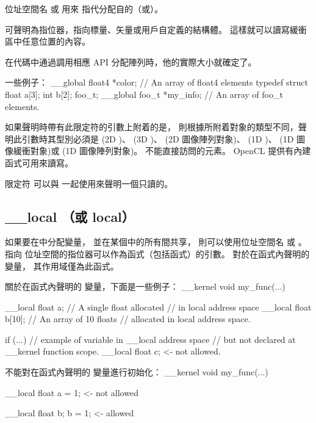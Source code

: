 位址空間名  或  用來
指代分配自的（或）。

 可聲明為指位器，指向標量、矢量或用戶自定義的結構體。
這樣就可以讀寫緩衝區中任意位置的內容。

在代碼中通過調用相應 API 分配陣列時，他的實際大小就確定了。

一些例子：
\startclc
__global float4	*color;		// An array of float4 elements
typedef struct {
	float	a[3];
	int	b[2];
} foo_t;
__global foo_t	*my_info;	// An array of foo_t elements.
\stopclc

如果聲明時帶有此限定符的引數上附着的是，
則根據所附着對象的類型不同，聲明此引數時其型別必須是
  (2D )、  (3D )、
  (2D 圖像陣列對象)、  (1D )、
  (1D 圖像緩衝對象)或  (1D 圖像陣列對象)。
不能直接訪問的元素。 OpenCL 提供有內建函式可用來讀寫。

限定符  可以與  一起使用來聲明一個只讀的。

\subsection{__local （或 local）}

如果要在中分配變量，
並在某個中的所有間共享，
則可以使用位址空間名  或 。
指向  位址空間的指位器可以作為函式（包括函式）的引數。
對於在函式內聲明的  變量，
其作用域僅為此函式。

關於在函式內聲明的  變量，下面是一些例子：
\startclc
__kernel void my_func(...)
{
	__local float	a;	// A single float allocated
				// in local address space
	__local float	b[10];	// An array of 10 floats
				// allocated in local address space.

	if (...)
	{
		// example of variable in __local address space
		// but not declared at __kernel function scope.
		__local float	c;	<- not allowed.
	}
}
\stopclc

不能對在函式內聲明的  變量進行初始化：
\startclc
__kernel void my_func(...)
{
	__local float	a = 1;	<- not allowed

	__local float	b;
	b = 1;			<- allowed
}
\stopclc

